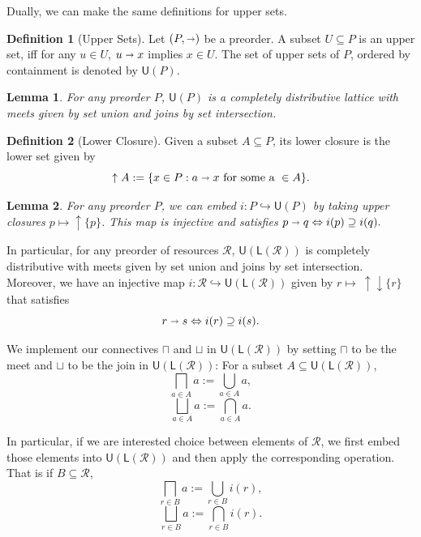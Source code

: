 \documentclass[12pt]{article}
\theoremstyle{definition}
\newtheorem{definition}{Definition}[section]
\theoremstyle{plain}
\newtheorem{lemma}{Lemma}[section]
\theoremstyle{plain}
\theoremstyle{plain}
\theoremstyle{plain}
\theoremstyle{remark}
\theoremstyle{remark}
\newcommand{\mc}[1]{\mathcal{#1}}
\newcommand{\sub}{\subseteq}
\newcommand{\low}{\mathsf{L}}
\newcommand{\upper}{\mathsf{U}}
\newcommand{\upc}[1]{{\uparrow #1}}
\begin{document}
Dually, we can make the same definitions for upper sets.

\begin{definition}[Upper Sets]
	Let $(P,\shortrightarrow)$ be a preorder. A subset $U \sub P$ is an upper set, iff for any $u \in U$, $u \shortrightarrow x$ implies $x \in U$. The set of upper sets of $P$, ordered by containment is denoted by $\upper(P)$. 
\end{definition}

\begin{lemma}
	For any preorder $P$, $\upper(P)$ is a completely distributive lattice with meets given by set union and joins by set intersection.
\end{lemma}

\begin{definition}[Lower Closure]
	Given a subset $A \sub P$, its lower closure is the lower set given by $$\upc{A} := \{x \in P: a \shortrightarrow x \text{ for some a } \in A\}.$$
\end{definition} 

\begin{lemma}
	For any preorder $P$, we can embed $i: P \hookrightarrow \upper(P)$ by taking upper closures $p \mapsto \uparrow \{p\}$. This map is injective and satisfies $p \shortrightarrow q \Leftrightarrow i(p) \supseteq i(q).$ 
\end{lemma}

In particular, for any preorder of resources $\mc{R}$, $\upper(\low(\mc{R}))$ is completely distributive with meets given by set union and joins by set intersection. Moreover, we have an injective map $i: \mc{R} \hookrightarrow \upper(\low(\mc{R}))$ given by $r \mapsto \: \uparrow \downarrow \{r\}$ that satisfies 
$$ r \shortrightarrow s \Leftrightarrow i(r) \supseteq i(s).$$

We implement our connectives $\sqcap$ and $\sqcup$ in $\upper(\low(\mc{R}))$ by setting $\sqcap$ to be the meet and $\sqcup$ to be the join in $\upper(\low(\mc{R}))$: For a subset $A \sub \upper(\low(\mc{R}))$,
$$ \bigsqcap_{a \in A} a :=  \bigcup_{a \in A} a,$$
$$ \bigsqcup_{a \in A} a := \bigcap_{a \in A} a.$$

In particular, if we are interested choice between elements of $\mc{R}$, we first embed those elements into $\upper(\low(\mc{R}))$ and then apply the corresponding operation. That is if $B \sub \mc{R}$,
$$ \bigsqcap_{r \in B} a :=  \bigcup_{r \in B} i(r),$$
$$ \bigsqcup_{r \in B} a := \bigcap_{r \in B} i(r).$$
\end{document}
